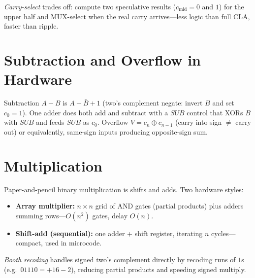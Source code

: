 \emph{Carry-select} trades off: compute two speculative results ($c_{\text{mid}}=0$ and $1$) for the upper half
and MUX-select when the real carry arrives---less logic than full CLA, faster than ripple.

\section{Subtraction and Overflow in Hardware}
Subtraction $A-B$ is $A+\bar B+1$ (two's complement negate: invert $B$ and set $c_0=1$). One adder does both
add and subtract with a $\mathit{SUB}$ control that XORs $B$ with $\mathit{SUB}$ and feeds $\mathit{SUB}$ as $c_0$.
Overflow $V = c_n\oplus c_{n-1}$ (carry into sign $\neq$ carry out) or equivalently, same-sign inputs producing opposite-sign sum.

\section{Multiplication}
\label{sec:multiplication}
Paper-and-pencil binary multiplication is shifts and adds. Two hardware styles:

\begin{itemize}
    \item \textbf{Array multiplier:} $n\times n$ grid of AND gates (partial products) plus adders summing rows---$O(n^2)$ gates, delay $O(n)$.
    \item \textbf{Shift-add (sequential):} one adder + shift register, iterating $n$ cycles---compact, used in microcode.
\end{itemize}
\emph{Booth recoding} handles signed two's complement directly by recoding runs of $1$s (e.g.\ $01110 = +16-2$),
reducing partial products and speeding signed multiply.

